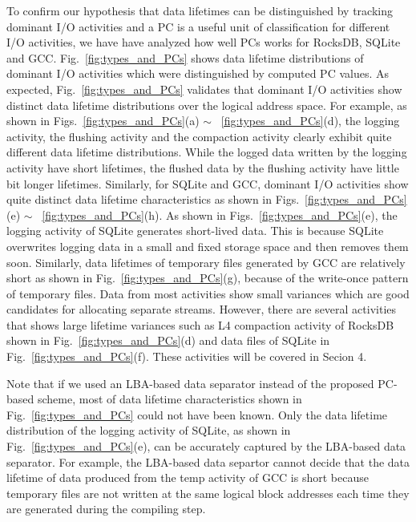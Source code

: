 To confirm our hypothesis that data lifetimes can be distinguished by tracking
dominant I/O activities and a PC is a useful unit of classification for 
different I/O activities,
{\color{blue}we have have analyzed how well PCs works for RocksDB, SQLite and GCC.
Fig.~\ref{fig:types_and_PCs} shows data lifetime distributions of 
dominant I/O activities which were distinguished by computed PC values.}
As expected, Fig.~\ref{fig:types_and_PCs} validates that dominant I/O activities 
show distinct data lifetime distributions over the logical address space.
For example, as shown in Figs.~\ref{fig:types_and_PCs}(a) $\sim$ 
~\ref{fig:types_and_PCs}(d), 
the logging activity, the flushing activity and the compaction activity 
clearly exhibit quite different data lifetime distributions.
While the logged data written by the logging activity have short lifetimes, 
the flushed data by the flushing activity have little bit longer lifetimes.  
Similarly, for SQLite and GCC, dominant I/O
activities show quite distinct data lifetime characteristics as shown in 
Figs.~\ref{fig:types_and_PCs}(e) $\sim$ ~\ref{fig:types_and_PCs}(h).
As shown in Figs.~\ref{fig:types_and_PCs}(e), the logging activity of
SQLite generates short-lived data.  This is because SQLite overwrites logging
data in a small and fixed storage space and then removes them soon. 
Similarly,
data lifetimes of temporary files generated by GCC are 
relatively short as shown in Fig.~\ref{fig:types_and_PCs}(g),
because of the write-once pattern of temporary files.
Data from most activities show small variances which are good 
candidates for allocating separate streams. 
However, there are several activities that shows large lifetime variances
such as L4 compaction activity of RocksDB shown in Fig.~\ref{fig:types_and_PCs}(d) 
and data files of SQLite in Fig.~\ref{fig:types_and_PCs}(f).
These activities will be covered in Secion 4.

Note that if we used an LBA-based data separator instead of the proposed PC-based scheme, 
most of data lifetime characteristics shown in Fig.~\ref{fig:types_and_PCs} could 
not have been known.  Only the data lifetime
distribution of the logging activity of SQLite, as shown in Fig.~\ref{fig:types_and_PCs}(e), 
can be accurately captured by the LBA-based data separator.  
For example, the LBA-based data separtor cannot 
decide that the data lifetime of data produced from the temp activity of GCC 
is short because temporary files are not written at the same logical block addresses 
each time they are generated during
the compiling step. 

